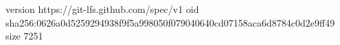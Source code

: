 version https://git-lfs.github.com/spec/v1
oid sha256:0626a0d5259294938f9f5a998050f079040640cd07158aca6d8784c0d2e9ff49
size 7251
